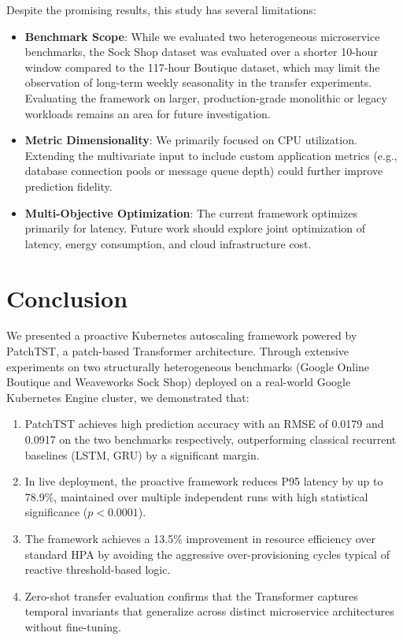\documentclass[conference]{IEEEtran}
\begin{document}
Despite the promising results, this study has several limitations:
\begin{itemize}
    \item \textbf{Benchmark Scope}: While we evaluated two heterogeneous microservice benchmarks, the Sock Shop dataset was evaluated over a shorter 10-hour window compared to the 117-hour Boutique dataset, which may limit the observation of long-term weekly seasonality in the transfer experiments. Evaluating the framework on larger, production-grade monolithic or legacy workloads remains an area for future investigation.
    \item \textbf{Metric Dimensionality}: We primarily focused on CPU utilization. Extending the multivariate input to include custom application metrics (e.g., database connection pools or message queue depth) could further improve prediction fidelity.
    \item \textbf{Multi-Objective Optimization}: The current framework optimizes primarily for latency. Future work should explore joint optimization of latency, energy consumption, and cloud infrastructure cost.
\end{itemize}

\section{Conclusion}\label{sec:conclusion}

We presented a proactive Kubernetes autoscaling framework powered by PatchTST, a patch-based Transformer architecture. Through extensive experiments on two structurally heterogeneous benchmarks (Google Online Boutique and Weaveworks Sock Shop) deployed on a real-world Google Kubernetes Engine cluster, we demonstrated that:

\begin{enumerate}
    \item PatchTST achieves high prediction accuracy with an RMSE of 0.0179 and 0.0917 on the two benchmarks respectively, outperforming classical recurrent baselines (LSTM, GRU) by a significant margin.
    \item In live deployment, the proactive framework reduces P95 latency by up to 78.9\%, maintained over multiple independent runs with high statistical significance ($p < 0.0001$).
    \item The framework achieves a 13.5\% improvement in resource efficiency over standard HPA by avoiding the aggressive over-provisioning cycles typical of reactive threshold-based logic.
    \item Zero-shot transfer evaluation confirms that the Transformer captures temporal invariants that generalize across distinct microservice architectures without fine-tuning.
\end{enumerate}
\end{document}
